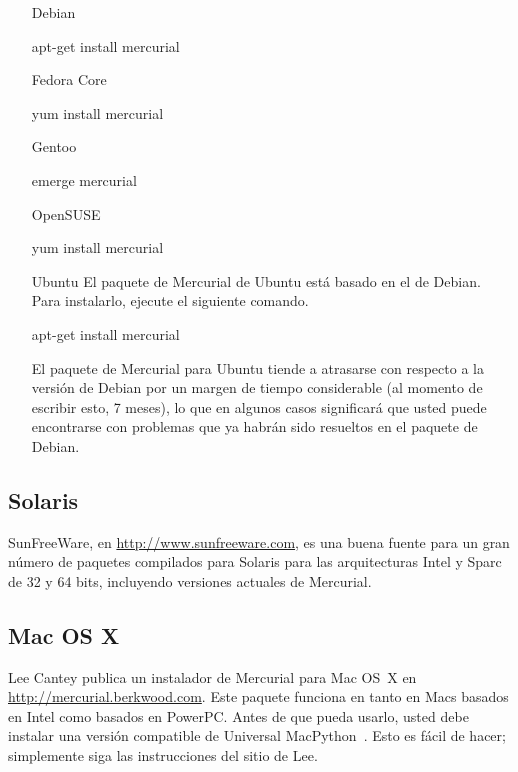 \begin{itemize}
\item[Debian]
  \begin{codesample4}
    apt-get install mercurial
  \end{codesample4}

\item[Fedora Core]
  \begin{codesample4}
    yum install mercurial
  \end{codesample4}

\item[Gentoo]
  \begin{codesample4}
    emerge mercurial
  \end{codesample4}

\item[OpenSUSE]
  \begin{codesample4}
    yum install mercurial
  \end{codesample4}

\item[Ubuntu] El paquete de Mercurial de Ubuntu está basado en el de
    Debian. Para instalarlo, ejecute el siguiente comando.
  \begin{codesample4}
    apt-get install mercurial
  \end{codesample4}
  El paquete de Mercurial para Ubuntu tiende a atrasarse con respecto
  a la versión de Debian por un margen de tiempo considerable
  (al momento de escribir esto, 7 meses), lo que en algunos casos
  significará que usted puede encontrarse con problemas que ya habrán
  sido resueltos en el paquete de Debian.
\end{itemize}

\subsection{Solaris}

SunFreeWare, en \url{http://www.sunfreeware.com}, es una buena fuente
para un gran número de paquetes compilados para Solaris para las
arquitecturas Intel y Sparc de 32 y 64 bits, incluyendo versiones
actuales de Mercurial.

\subsection{Mac OS X}

Lee Cantey publica un instalador de Mercurial para Mac OS~X en 
\url{http://mercurial.berkwood.com}.  Este paquete funciona en tanto
en Macs basados en Intel como basados en PowerPC. Antes de que pueda
usarlo, usted debe instalar una versión compatible de Universal
MacPython~\cite{web:macpython}. Esto es fácil de hacer; simplemente
siga las instrucciones del sitio de Lee.

